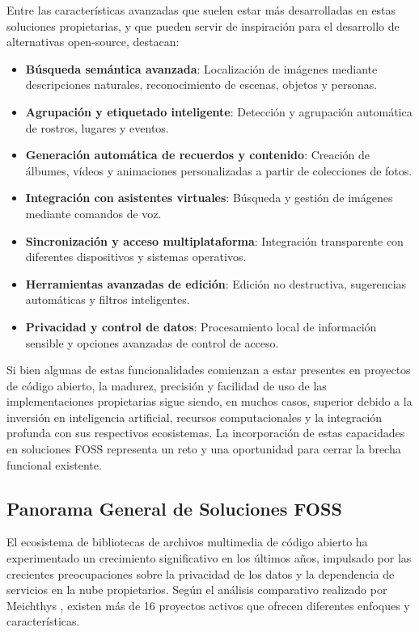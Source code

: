 Entre las características avanzadas que suelen estar más desarrolladas en estas soluciones propietarias, y que pueden servir de inspiración para el desarrollo de alternativas open-source, destacan:
\begin{itemize}
    \item \textbf{Búsqueda semántica avanzada}: Localización de imágenes mediante descripciones naturales, reconocimiento de escenas, objetos y personas.
    \item \textbf{Agrupación y etiquetado inteligente}: Detección y agrupación automática de rostros, lugares y eventos.
    \item \textbf{Generación automática de recuerdos y contenido}: Creación de álbumes, vídeos y animaciones personalizadas a partir de colecciones de fotos.
    \item \textbf{Integración con asistentes virtuales}: Búsqueda y gestión de imágenes mediante comandos de voz.
    \item \textbf{Sincronización y acceso multiplataforma}: Integración transparente con diferentes dispositivos y sistemas operativos.
    \item \textbf{Herramientas avanzadas de edición}: Edición no destructiva, sugerencias automáticas y filtros inteligentes.
    \item \textbf{Privacidad y control de datos}: Procesamiento local de información sensible y opciones avanzadas de control de acceso.
\end{itemize}

Si bien algunas de estas funcionalidades comienzan a estar presentes en proyectos de código abierto, la madurez, precisión y facilidad de uso de las implementaciones propietarias sigue siendo, en muchos casos, superior debido a la inversión en inteligencia artificial, recursos computacionales y la integración profunda con sus respectivos ecosistemas. La incorporación de estas capacidades en soluciones FOSS representa un reto y una oportunidad para cerrar la brecha funcional existente.

\subsection{Panorama General de Soluciones FOSS}

El ecosistema de bibliotecas de archivos multimedia de código abierto ha experimentado un crecimiento significativo en los últimos años, impulsado por las crecientes preocupaciones sobre la privacidad de los datos y la dependencia de servicios en la nube propietarios. Según el análisis comparativo realizado por Meichthys \parencite{meichthys2024}, existen más de 16 proyectos activos que ofrecen diferentes enfoques y características.

